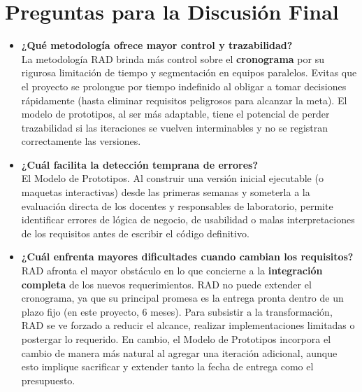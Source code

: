 \documentclass[pdflatex,sn-mathphys-num]{sn-jnl}%
\theoremstyle{thmstyleone}%
\theoremstyle{thmstyletwo}%
\theoremstyle{thmstylethree}%
\begin{document}
 \section{Preguntas para la Discusión Final}\label{sec:discusion}
 \begin{itemize}
 	\item \textbf{¿Qué metodología ofrece mayor control y trazabilidad?}\\
	La metodología RAD brinda más control sobre el \textbf{cronograma} por su rigurosa limitación de tiempo y segmentación en equipos paralelos. Evitas que el proyecto se prolongue por tiempo indefinido al obligar a tomar decisiones rápidamente (hasta eliminar requisitos peligrosos para alcanzar la meta). El modelo de prototipos, al ser más adaptable, tiene el potencial de perder trazabilidad si las iteraciones se vuelven interminables y no se registran correctamente las versiones.
 	
 	\item \textbf{¿Cuál facilita la detección temprana de errores?}\\
 	El Modelo de Prototipos. Al construir una versión inicial ejecutable (o maquetas interactivas) desde las primeras semanas y someterla a la evaluación directa de los docentes y responsables de laboratorio, permite identificar errores de lógica de negocio, de usabilidad o malas interpretaciones de los requisitos antes de escribir el código definitivo.
 	\item \textbf{¿Cuál enfrenta mayores dificultades cuando cambian los requisitos?}\\
 	RAD afronta el mayor obstáculo en lo que concierne a la \textbf{integración completa} de los nuevos requerimientos. RAD no puede extender el cronograma, ya que su principal promesa es la entrega pronta dentro de un plazo fijo (en este proyecto, 6 meses). Para subsistir a la transformación, RAD se ve forzado a reducir el alcance, realizar implementaciones limitadas o postergar lo requerido. En cambio, el Modelo de Prototipos incorpora el cambio de manera más natural al agregar una iteración adicional, aunque esto implique sacrificar y extender tanto la fecha de entrega como el presupuesto.
 	

\end{itemize}
\end{document}
